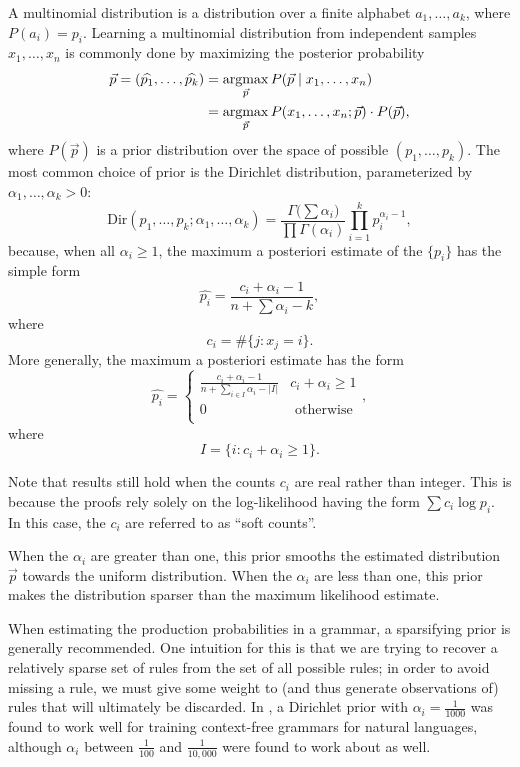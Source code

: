 A multinomial distribution is a distribution over a finite alphabet
$a_1,\dots, a_k$, where $P(a_i)=p_i$. Learning a multinomial
distribution from independent samples $x_1,\dots, x_n$ is commonly done by
maximizing the posterior probability 
\begin{align*}
\vec{p} = (\widehat{p_1},\dots, \widehat{p_k}) &= \operatorname*{argmax}_{\vec{p}}
P(\vec{p} \mid x_1,\dots,x_n )\\
&= \operatorname*{argmax}_{\vec{p}} P(x_1,\dots,x_n; \vec{p}) \cdot P(\vec{p}),
\end{align*}
where $P(\vec{p})$ is a prior distribution over the space of possible
$(p_1,\dots,p_k)$. 
The most common choice of prior is the Dirichlet
distribution, parameterized by $\alpha_1,\dots, \alpha_k > 0$:
$$\mathrm{Dir}(p_1,\dots, p_k; \alpha_1,\dots, \alpha_k) = \frac{\Gamma\bigl(\sum \alpha_i\bigr)}{\prod \Gamma(\alpha_i)} \prod_{i=1}^k p_i^{\alpha_i - 1},$$
because, when all $\alpha_i \ge 1$, the maximum a posteriori estimate of the $\{p_i\}$ has the simple form
$$\widehat{p_i} = \frac{ c_i + \alpha_i - 1}{ n + \sum
  \alpha_i - k},$$ 
where
$$c_i = \#\{j : x_j = i\}.$$
More generally, the maximum a posteriori estimate has the form
$$\widehat{p_i} = \begin{cases}
\frac{ c_i + \alpha_i - 1}{ n + \sum_{i\in I} \alpha_i - |I|} & c_i + \alpha_i \ge 1\\
0 & \mbox{ otherwise}\\
\end{cases},$$ 
where
$$I = \{i : c_i + \alpha_i \ge 1\}.$$

Note that results still hold when the counts $c_i$ are real rather
than integer. This is because the proofs rely solely on the
log-likelihood having the form $\sum c_i \log p_i$. In this case, the
$c_i$ are referred to as ``soft counts''.

When the $\alpha_i$ are greater than one, this prior smooths the
estimated distribution $\vec{p}$ towards the uniform
distribution. When the $\alpha_i$ are less than one, this prior makes
the distribution sparser than the maximum likelihood estimate. 

When estimating the production probabilities in a grammar, a
sparsifying prior is generally recommended. One intuition for this is
that we are trying to recover a relatively sparse set of rules from
the set of all possible rules; in order to avoid missing a rule, we
must give some weight to (and thus generate observations of) rules
that will ultimately be discarded. In \cite{johnson-naacl}, a
Dirichlet prior with $\alpha_i = \frac{1}{1000}$ was found to work
well for training context-free grammars for natural languages,
although $\alpha_i$ between $\frac{1}{100}$ and $\frac{1}{10,000}$
were found to work about as well.

